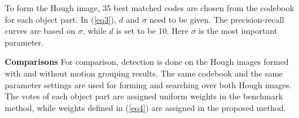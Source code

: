 To form the Hough image, 35 best matched codes are chosen from the codebook for each object part. In (\ref{eq3}), $d$ and $\sigma$ need to be given. The precision-recall curves are based on $\sigma$, while $d$ is set to be 10. Here $\sigma$ is the most important parameter.

\textbf{Comparisons} For comparison, detection is done on the Hough images formed with and without motion grouping results. The same codebook and the same parameter settings are used for forming and searching over both Hough images. The votes of each object part are assigned uniform weights in the benchmark method, while weights defined in (\ref{eq4}) are assigned in the proposed method.
\begin{figure}
\centering
{}
\end{figure}
